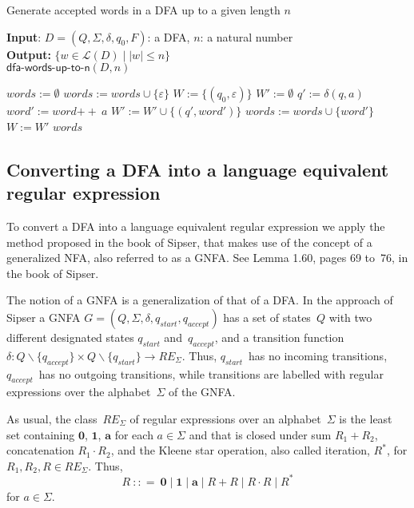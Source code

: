 \documentclass[11pt]{article}
\newcommand*{\Language}[1]{\ensuremath{\mathcal{L}(#1)}}
\newcommand{\qaccept}{q_{\mathit{accept}}}
\newcommand{\qstart}{q_{\mathit{start}}}
\newcommand{\concat}{\ensuremath{+\!\!+\:}}
\begin{document}
\begin{algorithm}
\small
\caption{Generate accepted words in a DFA up to a given length $n$}
\vspace*{1ex}
{\textbf{Input}:}
$D = (Q, \Sigma, \delta, q_0, F)$: a DFA, $n$: a natural number \\
\textbf{Output:}
$ \{ w \in \Language{D} \mid |w| \leq n \} $ \\

$\textsf{dfa-words-up-to-n}(D, n)$
\begin{algorithmic}[1]
\State $words := \emptyset$
  \State $words := words \cup \{ \varepsilon \}$
\EndIf
\State $W := \{ (q_0, \varepsilon) \}$
\For { ${i \in [0 \ldots n)}$ }
  \State $W' := \emptyset$
      \State $q' := \delta(q, a)$
      \State $word' := word \concat a$
      \State $W' := W' \cup \{ (q', word') \}$
        \State $words := words \cup \{ word' \}$
      \EndIf
    \EndFor
  \EndFor
  \State $W := W'$
\EndFor
\State \Return $words$
\end{algorithmic}
\end{algorithm}

\clearpage

\subsection{Converting a DFA into a language equivalent regular expression}

To convert a DFA into a language equivalent regular expression we apply the method proposed in the book of Sipser, that makes use of the concept of a generalized NFA, also referred to as a GNFA\@. See Lemma 1.60, pages 69 to~76, in the book of Sipser.

The notion of a GNFA is a generalization of that of a DFA\@. 
In the approach of Sipser a GNFA $G = (Q, \Sigma, \delta, \qstart, \qaccept)$ has a set of states~$Q$ with two different designated states $\qstart$ and~$\qaccept$, and a transition function $\delta : Q \backslash \lbrace \qaccept \rbrace \times Q \backslash \lbrace \qstart \rbrace \to \mathit{RE}_\Sigma$. 
Thus, $\qstart$~has no incoming transitions, $\qaccept$~has no outgoing transitions, while transitions are labelled with regular expressions over the alphabet~$\Sigma$ of the GNFA\@.

As usual, the class~$\mathit{RE}_\Sigma$ of regular expressions over an alphabet~$\Sigma$ is the least set containing $\textbf{0}$, $\textbf{1}$, $\textbf{a}$ for each $a \in \Sigma$ and that is closed under sum $R_1 + R_2$, concatenation $R_1 \cdot R_2$, and the Kleene star operation, also called iteration, $R^\ast$, for $R_1, R_2, R \in \mathit{RE}_\Sigma$.
Thus,
\begin{displaymath}
R \: {:}{:}{=} \: \textbf{0} \mid \textbf{1} \mid \textbf{a} \mid R + R \mid R \cdot R \mid R^\ast
\end{displaymath}
for $a \in \Sigma$.
\bigskip
\end{document}
